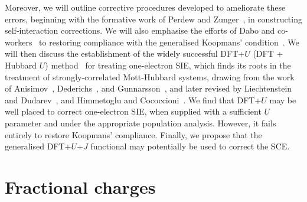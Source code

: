 Moreover, 
we will outline corrective procedures developed 
to ameliorate these errors, 
{beginning with the formative 
work of Perdew and Zunger~\cite{PhysRevB.23.5048}, 
in constructing    
self-interaction corrections.
%
We will also emphasise  
the efforts of Dabo and co-workers~\cite{PhysRevB.82.115121,PhysRevB.90.075135,PhysRevLett.114.166405,nguyen2017koopmans} 
to restoring compliance with 
the generalised Koopmans' condition~\cite{KOOPMANS1934104,PhysRev.123.420,PhysRevB.82.115121,PhysRevB.90.075135}.}
%
{
We will then discuss 
the establishment of the widely successful 
DFT+$U$ (DFT + Hubbard $U$) method~\cite{PhysRevB.43.7570,PhysRevB.44.943,
PhysRevB.48.16929,PhysRevB.50.16861,PhysRevB.52.R5467,PhysRevB.57.1505,
PhysRevB.58.1201,PhysRevB.71.035105,QUA:QUA24521}
for treating one-electron SIE, 
which finds its roots in the 
treatment of strongly-correlated Mott-Hubbard systems, 
drawing from the work of 
Anisimov~\cite{PhysRevB.43.7570,PhysRevB.44.943,PhysRevB.48.16929,PhysRevB.50.16861}, Dederichs~\cite{PhysRevB.41.514,PhysRevB.50.16861,PhysRevB.49.6736}, and Gunnarsson~\cite{PhysRevB.39.1708,PhysRevB.43.7570,PhysRevB.37.9919,0295-5075-7-2-013,PhysRevLett.65.1148,PhysRevLett.68.1900}, 
and later revised by Liechtenstein and Dudarev~\cite{0953-8984-9-4-002,PhysRevB.52.R5467,PhysRevB.56.4900,0953-8984-9-35-010}, 
and Himmetoglu and Cococcioni~\cite{PhysRevB.71.035105,PhysRevB.84.115108}.
%
We find that DFT+$U$ may be well placed 
to correct one-electron SIE, 
when supplied with a sufficient $U$ parameter 
and under the appropriate population analysis.
%
However, it fails entirely 
to restore Koopmans' compliance.
%
Finally, we propose that 
the generalised DFT+$U$+$J$ functional 
may potentially be used to correct the SCE.}

\section{Fractional charges}
\label{sec:fractional_charges}

